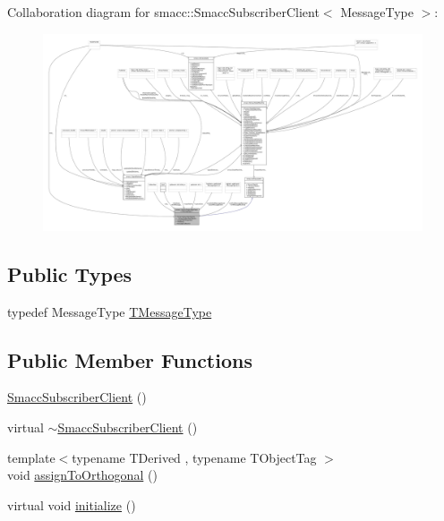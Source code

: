 Collaboration diagram for smacc\+:\+:Smacc\+Subscriber\+Client$<$ Message\+Type $>$\+:
\nopagebreak
\begin{figure}[H]
\begin{center}
\leavevmode
\includegraphics[width=350pt]{classsmacc_1_1SmaccSubscriberClient__coll__graph}
\end{center}
\end{figure}
\subsection*{Public Types}
\begin{DoxyCompactItemize}
\item 
typedef Message\+Type \hyperlink{classsmacc_1_1SmaccSubscriberClient_ae0666debefce5c0e7b355ded711ffa79}{T\+Message\+Type}
\end{DoxyCompactItemize}
\subsection*{Public Member Functions}
\begin{DoxyCompactItemize}
\item 
\hyperlink{classsmacc_1_1SmaccSubscriberClient_a864c5e7a7d267428e971d39b08a75066}{Smacc\+Subscriber\+Client} ()
\item 
virtual \hyperlink{classsmacc_1_1SmaccSubscriberClient_a1cff9c8ba162decf72b951c9e3459b7c}{$\sim$\+Smacc\+Subscriber\+Client} ()
\item 
{\footnotesize template$<$typename T\+Derived , typename T\+Object\+Tag $>$ }\\void \hyperlink{classsmacc_1_1SmaccSubscriberClient_aed3df1c2c6e2aed9001971d450b5168b}{assign\+To\+Orthogonal} ()
\item 
virtual void \hyperlink{classsmacc_1_1SmaccSubscriberClient_acfa97685ecc588fe61eb57002354b58a}{initialize} ()
\end{DoxyCompactItemize}
